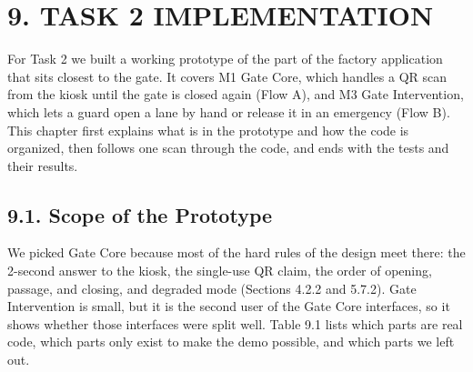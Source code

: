\section*{9. TASK 2 IMPLEMENTATION}

{}

For Task 2 we built a working prototype of the part of the factory application that sits closest to the gate. It covers M1 Gate Core, which handles a QR scan from the kiosk until the gate is closed again (Flow A), and M3 Gate Intervention, which lets a guard open a lane by hand or release it in an emergency (Flow B). This chapter first explains what is in the prototype and how the code is organized, then follows one scan through the code, and ends with the tests and their results.

\subsection*{9.1. Scope of the Prototype}

{}

We picked Gate Core because most of the hard rules of the design meet there: the 2-second answer to the kiosk, the single-use QR claim, the order of opening, passage, and closing, and degraded mode (Sections 4.2.2 and 5.7.2). Gate Intervention is small, but it is the second user of the Gate Core interfaces, so it shows whether those interfaces were split well. Table 9.1 lists which parts are real code, which parts only exist to make the demo possible, and which parts we left out.

